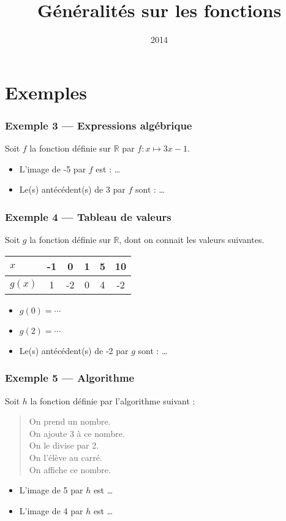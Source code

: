 \documentclass[12pt, aspectratio=169]{beamer}
\institute{Lycée Marie Curie}
\date{2014}
\title{Généralités sur les fonctions}
\begin{document}
\section{Exemples}
\begin{frame}

  \frametitle{Exemple 3 --- Expressions algébrique}

  Soit $f$ la fonction définie sur $\mathbb{R}$ par $f:x\mapsto 3x-1$.
  \begin{itemize}
    \item L'image de -5 par $f$ est : \ldots
    \item Le(s) antécédent(s) de 3 par $f$ sont : \ldots
  \end{itemize}
\end{frame}

\begin{frame}

  \frametitle{Exemple 4 --- Tableau de valeurs}

  Soit $g$ la fonction définie sur $\mathbb{R}$, dont on connait les valeurs suivantes.

  \begin{center}
    \begin{tabular}{p{1cm}|c|c|c|c|c}
      $x$ & -1 & 0 & 1 & 5 & 10 \\
      \hline
      $g(x)$ & 1 & -2 & 0 & 4 & -2\\
    \end{tabular}
  \end{center}
  \begin{itemize}
  \item $g(0)=\cdots$
  \item $g(2)=\cdots$
    \item Le(s) antécédent(s) de -2 par $g$ sont : \ldots
  \end{itemize}
\end{frame}

\begin{frame}
  \frametitle{Exemple 5 --- Algorithme}

  Soit $h$ la fonction définie par l'algorithme suivant :

  \begin{quote}
    On prend un nombre.\\
    On ajoute 3 à ce nombre. \\
    On le divise par 2. \\
    On l'élève au carré. \\
    On affiche ce nombre.
  \end{quote}

  \begin{itemize}
    \item L'image de 5 par $h$ est \ldots
    \item L'image de 4 par $h$ est \ldots
  \end{itemize}
\end{frame}
\end{document}
